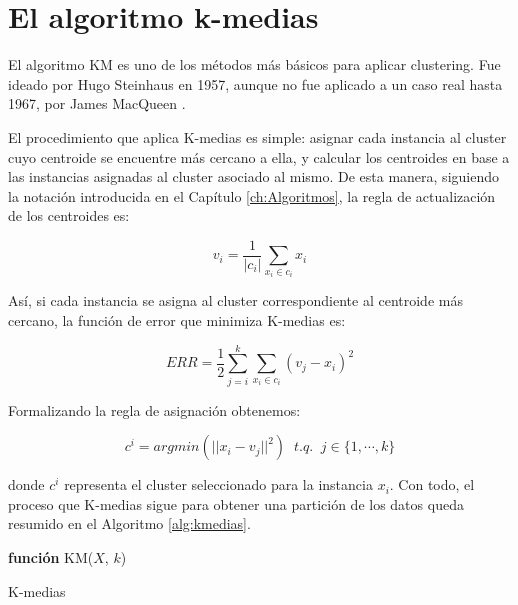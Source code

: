 \chapter{El algoritmo k-medias}\label{ap:kmeans}

El algoritmo \acf{KM} es uno de los métodos más básicos para aplicar clustering. Fue ideado por  Hugo Steinhaus en 1957, aunque no fue aplicado a un caso real hasta 1967, por James MacQueen \cite{KMEANS:1967}. 

El procedimiento que aplica K-medias es simple: asignar cada instancia al cluster cuyo centroide se encuentre más cercano a ella, y calcular los centroides en base a las instancias asignadas al cluster asociado al mismo. De esta manera, siguiendo la notación introducida en el Capítulo \ref{ch:Algoritmos}, la regla de actualización de los centroides es:

\begin{equation}
v_i = \frac{1}{|c_i|} \sum_{x_i \in c_i} x_i
\label{a1}
\end{equation}

Así, si cada instancia se asigna al cluster correspondiente al centroide más cercano, la función de error que minimiza K-medias es:

\begin{equation}
ERR = \frac{1}{2} \sum_{j = i}^{k} \sum_{x_i \in c_i} (v_j - x_i)^2
\label{a2}
\end{equation}

Formalizando la regla de asignación obtenemos:

\begin{equation}
c^i = argmin(||x_i - v_j||^2) \;\; t.q. \;\; j \in \{1, \cdots, k\}
\label{a3}
\end{equation}

donde $c^i$ representa el cluster seleccionado para la instancia $x_i$. Con todo, el proceso que K-medias sigue para obtener una partición de los datos queda resumido en el Algoritmo \ref{alg:kmedias}.

\begin{algorithm}
	
	\BlankLine
	\BlankLine
	\textbf{función} KM($X$, $k$) 
	\BlankLine
	\caption{K-medias}
	\label{alg:kmedias}
\end{algorithm}


